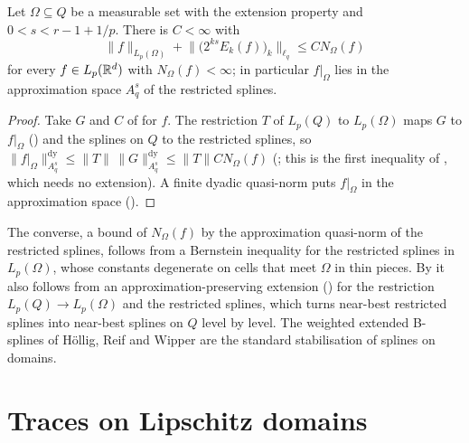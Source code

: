\begin{theorem}
\label{thm:domain-splines-direct}
\leanok
{}
Let $\Omega \subseteq Q$ be a measurable set with the extension property and
$0 < s < r - 1 + 1/p$. There is $C < \infty$ with
\[
  \|f\|_{L_p(\Omega)} + \bigl\|\bigl(2^{ks} E_k(f)\bigr)_k\bigr\|_{\ell_q} \leq C N_\Omega(f)
\]
for every $f \in L_p(\mathbb{R}^d)$ with $N_\Omega(f) < \infty$; in particular $f|_\Omega$ lies in the
approximation space $A^s_q$ of the restricted splines.
\end{theorem}

\begin{proof}
\leanok
{}
Take $G$ and $C$ of  for $f$. The restriction $T$ of $L_p(Q)$ to
$L_p(\Omega)$ maps $G$ to $f|_\Omega$ () and the splines on $Q$ to
the restricted splines, so $\|f|_\Omega\|^{\mathrm{dy}}_{A^s_q} \leq \|T\| \,
\|G\|^{\mathrm{dy}}_{A^s_q} \leq \|T\| C N_\Omega(f)$ (; this is the
first inequality of , which needs no extension). A finite dyadic quasi-norm
puts $f|_\Omega$ in the approximation space ().
\end{proof}

The converse, a bound of $N_\Omega(f)$ by the approximation quasi-norm of the restricted splines,
follows from a Bernstein inequality for the restricted splines in $L_p(\Omega)$, whose constants
degenerate on cells that meet $\Omega$ in thin pieces. By  it also follows from an
approximation-preserving extension () for the restriction
$L_p(Q) \to L_p(\Omega)$ and the restricted splines, which turns near-best restricted splines into
near-best splines on $Q$ level by level. The weighted extended B-splines of H\"ollig, Reif and
Wipper \cite{HolligReifWipper2001} are the standard stabilisation of splines on domains.

\chapter{Traces on Lipschitz domains}
\label{ch:traces-lipschitz}

